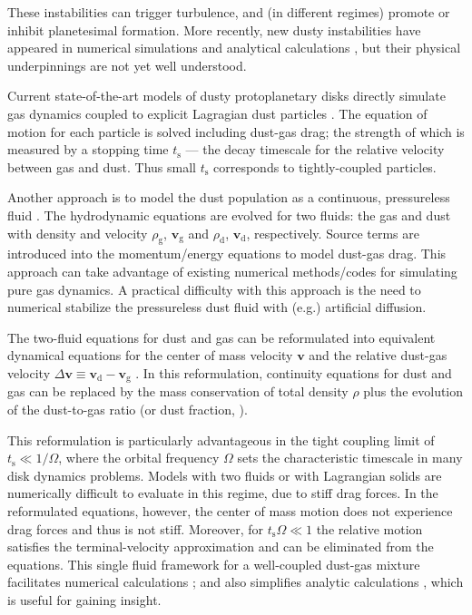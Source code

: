 \documentclass[iop, numberedappendix]{emulateapj}
\newcommand{\rhod}{\rho_\mathrm{d}}
\newcommand{\rhog}{\rho_\mathrm{g}}
\newcommand{\tstop}{t_\mathrm{s}}
\begin{document}
These instabilities can trigger turbulence, and (in different regimes) promote or inhibit  
planetesimal formation. 
More recently, new 
dusty instabilities have appeared in numerical  
simulations \citep{loren15,loren16,lamb16} and analytical calculations \citep{squire17,hopkins17},   
but their physical underpinnings are not yet well 
understood. 



Current state-of-the-art models of dusty protoplanetary
disks directly simulate gas dynamics coupled to explicit
Lagragian dust particles
\citep{johansen2006, nelson10,bai10,yang14,zhu14,gibbons15,simon16,baruteau16}. 
The equation of motion for each particle is solved 
including dust-gas drag; the strength of which is measured 
by a stopping time $\tstop$ --- the decay timescale for the 
relative velocity between gas and dust. Thus small $\tstop$
corresponds to tightly-coupled particles. 


Another approach is to model the dust population as a continuous, pressureless
fluid 
\citep{paardekooper06b,meheut12,laibe12,loren14,fu14b,surville16}. The 
hydrodynamic equations are evolved for two fluids: the gas and dust with density and
velocity $\rhog$, $\bm{v}_\mathrm{g}$ and $\rhod$, 
$\bm{v}_\mathrm{d}$, respectively. Source terms are introduced into
the momentum/energy equations to model dust-gas drag. This approach
can take advantage of existing numerical methods/codes for
simulating pure gas dynamics. A practical difficulty with this approach is the need to numerical stabilize the pressureless dust fluid with (e.g.) artificial diffusion.



The two-fluid equations for dust and gas can be reformulated into 
equivalent dynamical equations for the center of mass velocity $\bm{v}$
and the relative dust-gas velocity  $\Delta\bm{v}\equiv \bm{v}_\mathrm{d}-\bm{v}_\mathrm{g}$ 
\citep{youdin05a}. In this reformulation, continuity equations for dust and gas can be replaced 
by the mass conservation of total density $\rho$ plus the evolution of the dust-to-gas ratio 
(or dust fraction, \citealp{laibe14}).

This reformulation is particularly advantageous in the tight coupling limit of  $\tstop \ll 1/\Omega$, where the orbital frequency $\Omega$ sets the characteristic timescale in many disk dynamics problems.
Models with two fluids or with Lagrangian solids are numerically difficult to evaluate in this regime, due to stiff drag forces.  
In the reformulated equations, however, the center of mass motion does
not experience drag forces and thus is not stiff.  Moreover,
for $\tstop\Omega\ll 1$ the relative motion satisfies the terminal-velocity approximation and can be eliminated from the equations.  This single fluid framework for a well-coupled dust-gas mixture facilitates numerical calculations \citep{price15}; and also simplifies analytic calculations \citep{youdin05a,jacquet11}, which is useful for gaining insight.  
\end{document}
